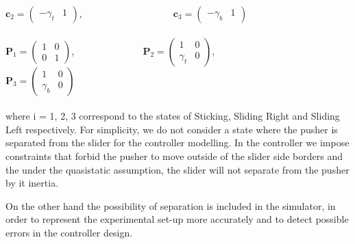 \documentclass[12,twoside]{TFG-GM}
\theoremstyle{definition}
\theoremstyle{remark}
\begin{document}
$\textbf{c}_2 = \begin{pmatrix}
-\gamma_t & 1
\end{pmatrix}$,\,\,\,\,\,\,\,\,\,\,\,\,\,\,\,\,\,\,\,\,\,\,\,\,\,\,\,\,\,\,\,\,\,\,\,\,\,\,\,\,\,\,\,\,\,\,\,\,\,\,\,\,\,\,\,
$\textbf{c}_3 = \begin{pmatrix}
-\gamma_b & 1
\end{pmatrix}$ \\ \\
$\textbf{P}_1 = \begin{pmatrix}
1 & 0 \\ 0 & 1
\end{pmatrix}$, \,\,\,\,\,\,\,\,\,\,\,\,\,\,\,\,\,\,\,\,\,\,\,\,\,\,\,\,\,\,\,\,\,\,\,\,\,\,\,  $\textbf{P}_2 = \begin{pmatrix}
1 & 0 \\ \gamma_t & 0
\end{pmatrix}$, \,\,\,\,\,\,\,\,\,\,\,\,\,\,\,\,\,\,\,\,\,\,\,\,\,\,\,\,\,\,\,\,\,\,\,\,\,\,\,\,\,\,\,\,\,\,\,\,\,\,\,\,\,  $\textbf{P}_3 = \begin{pmatrix}
1 & 0 \\ \gamma_b & 0
\end{pmatrix}$ \\ \\
where i = 1, 2, 3 correspond to the states of Sticking, Sliding Right and Sliding Left respectively. For simplicity, we do not consider a state where the pusher is separated from the slider for the controller modelling. In the controller we impose constraints that forbid the pusher to move outside of the slider side borders and the under the quasistatic assumption, the slider will not separate from the pusher by it inertia.

On the other hand the possibility of separation is included in the simulator, in order to represent the experimental set-up more accurately and to detect possible errors in the controller design.
\end{document}
